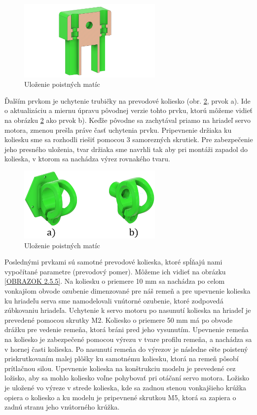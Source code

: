 \begin{figure}[]
	\centering
	\includegraphics[width=70mm]{obr/3Dprvok2.png}
	\caption{Uloženie poistných matíc}\label{OBRAZOK 2.5.3} 
\end{figure} 

Ďalším prvkom je uchytenie trubičky na prevodové koliesko (obr. \ref{OBRAZOK 2.5.4}, prvok a). Ide o aktualizáciu a miernu úpravu pôvodnej verzie tohto prvku, ktorú môžeme vidieť na obrázku \ref{OBRAZOK 2.5.4} ako prvok b). Keďže pôvodne sa zachytával priamo na hriadeľ servo motora, zmenou prešla práve časť uchytenia prvku. Pripevnenie držiaka ku koliesku sme sa rozhodli riešiť pomocou 3 samorezných skrutiek. Pre zabezpečenie jeho presného uloženia, tvar držiaka sme navrhli tak aby pri montáži zapadol do kolieska, v ktorom sa nachádza výrez rovnakého tvaru. 

\begin{figure}[]
	\centering
	\includegraphics[width=70mm]{obr/3Ddrziak.eps}
	\caption{Uloženie poistných matíc}\label{OBRAZOK 2.5.4} 
\end{figure} 

Poslednými prvkami sú samotné prevodové kolieska, ktoré spĺňajú nami vypočítané parametre (prevodový pomer). Môžeme ich vidieť na obrázku \ref{OBRAZOK 2.5.5}. Na koliesku o priemere 10 mm sa nachádza po celom vonkajšom obvode ozubenie dimenzované pre náš remeň a pre upevnenie kolieska ku hriadeľu serva sme namodelovali vnútorné ozubenie, ktoré zodpovedá zúbkovaniu hriadeľa. Uchytenie k servo motoru po nasunutí kolieska na hriadeľ je prevedené pomocou skrutky M2. Koliesko o priemere 50 mm má po obvode drážku pre vedenie remeňa, ktorá bráni pred jeho vysunutím. Upevnenie remeňa na koliesko je zabezpečené pomocou výrezu v tvare profilu remeňa, a nachádza sa v hornej časti kolieska. Po nasunutí remeňa do výrezov je následne ešte poistený priskrutkovaním malej plôšky ku samotnému koliesku, ktorá na remeň pôsobí prítlačnou silou. Upevnenie kolieska na konštrukciu modelu je prevedené cez ložisko, aby sa mohlo koliesko voľne pohybovať pri otáčaní servo motora. Ložisko je uložené vo výreze v strede kolieska, kde sa zadnou stenou vonkajšieho krúžka opiera o koliesko a ku modelu je pripevnené skrutkou M5, ktorá sa zapiera o zadnú stranu jeho vnútorného krúžka.   
 
